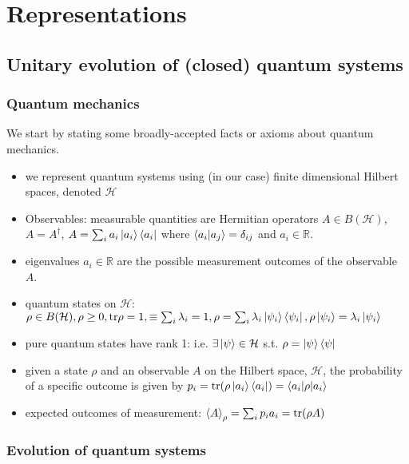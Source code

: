 \documentclass[../../note.tex]{subfiles}
\begin{document}
\chapter{Representations}
\section{Unitary evolution of (closed) quantum systems}
\subsection{Quantum mechanics}
We start by stating some broadly-accepted facts or axioms about quantum mechanics.
\begin{itemize}
    \item we represent quantum systems using (in our case) finite dimensional Hilbert spaces, denoted $\mathcal{H}$
    \item Observables: measurable quantities are Hermitian operators $A\in B(\mathcal{H})$, $A=A^{\dagger}$, $A=\sum_i a_i \ket{a_i}\bra{a_i}$ where $\braket{a_i|a_j}=\delta_{ij}$ and $a_i \in \mathbb{R}$.
    \item eigenvalues $a_i \in \mathbb{R}$ are the possible measurement outcomes of the observable $A$.
    \item quantum states on $\mathcal{H}$: $\rho \in B(\mathcal{H}), \rho \geq 0, \text{tr}\rho =1, \equiv \sum_i \lambda_i =1, \rho=\sum_i \lambda_i \ket{\psi_i}\bra{\psi_i}, \rho\ket{\psi_i}=\lambda_i \ket{\psi_i}$
    \item pure quantum states have rank 1: i.e. $\exists \ket{\psi}\in \mathcal{H}$ s.t. $\rho = \ket{\psi}\bra{\psi}$
    \item given a state $\rho$ and an observable $A$ on the Hilbert space, $\mathcal{H}$, the probability of a specific outcome is given by $p_i = \text{tr}(\rho \ket{a_i}\bra{a_i})=\braket{a_i|\rho |a_i}$
    \item expected outcomes of measurement: $\braket{A}_{\rho}=\sum_i p_i a_i =\text{tr}(\rho A)$
\end{itemize}

\subsection{Evolution of quantum systems}
\end{document}
